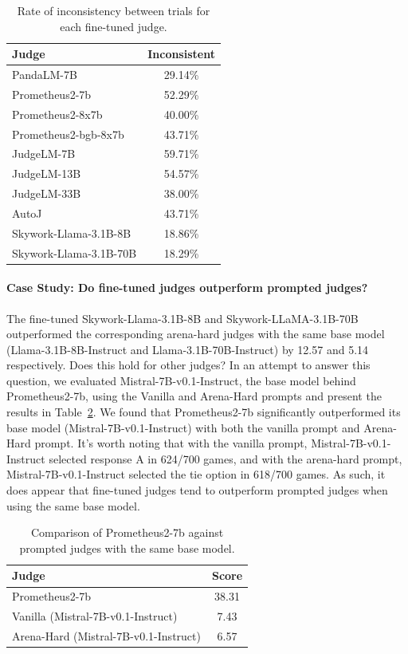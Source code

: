 \documentclass{article} %
\begin{document}
\begin{table}
\centering
\begin{tabular}{lc}\toprule
Judge & Inconsistent\\ \midrule
PandaLM-7B & 29.14\%\\
Prometheus2-7b & 52.29\%\\
Prometheus2-8x7b & 40.00\%\\
Prometheus2-bgb-8x7b & 43.71\%\\
JudgeLM-7B & 59.71\%\\
JudgeLM-13B & 54.57\%\\
JudgeLM-33B & 38.00\%\\
AutoJ & 43.71\%\\
Skywork-Llama-3.1B-8B & 18.86\%\\
Skywork-Llama-3.1B-70B & 18.29\%\\ \bottomrule
\end{tabular}
\caption{Rate of inconsistency between trials for each fine-tuned judge.}
\label{table:fine-tuned-consistency}
\end{table}

\paragraph{Case Study: Do fine-tuned judges outperform prompted judges?}
The fine-tuned Skywork-Llama-3.1B-8B and Skywork-LLaMA-3.1B-70B outperformed the corresponding arena-hard judges with the same base model (Llama-3.1B-8B-Instruct and Llama-3.1B-70B-Instruct) by 12.57 and 5.14 respectively. Does this hold for other judges? In an attempt to answer this question, we evaluated Mistral-7B-v0.1-Instruct, the base model behind Prometheus2-7b, using the Vanilla and Arena-Hard prompts and present the results in Table~\ref{table:fine-tuned-case-study}. We found that Prometheus2-7b significantly outperformed its base model (Mistral-7B-v0.1-Instruct) with both the vanilla prompt and Arena-Hard prompt. It's worth noting that with the vanilla prompt, Mistral-7B-v0.1-Instruct selected response A in 624/700 games, and with the arena-hard prompt, Mistral-7B-v0.1-Instruct selected the tie option in 618/700 games. As such, it does appear that fine-tuned judges tend to outperform prompted judges when using the same base model.

\begin{table}
\centering
\begin{tabular}{lc}\toprule
Judge & Score\\ \midrule
Prometheus2-7b & 38.31\\
Vanilla (Mistral-7B-v0.1-Instruct) & 7.43\\
Arena-Hard (Mistral-7B-v0.1-Instruct) & 6.57\\ \bottomrule
\end{tabular}
\caption{Comparison of Prometheus2-7b against prompted judges with the same base model.}
\label{table:fine-tuned-case-study}
\end{table}
\end{document}
